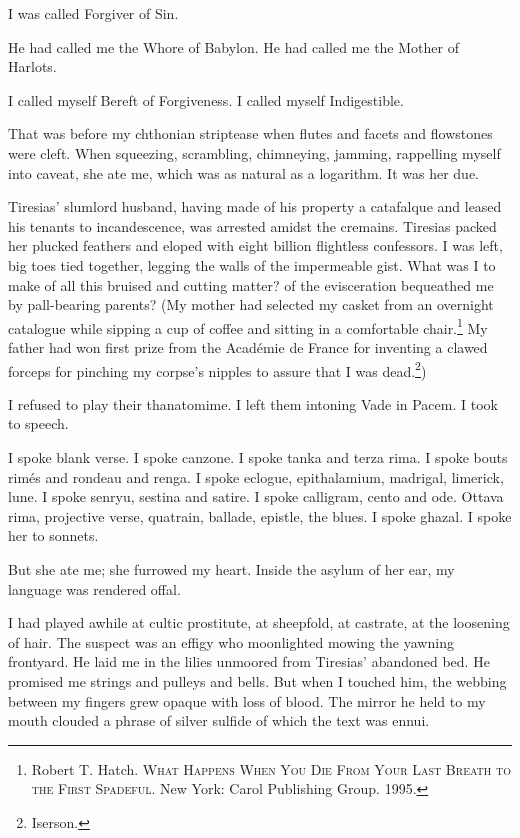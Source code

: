 \documentclass[
]{memoir}
\begin{document}
I was called Forgiver of Sin.

He had called me the Whore of Babylon. He had called me the Mother of
Harlots.

I called myself Bereft of Forgiveness. I called myself Indigestible.

That was before my chthonian striptease when flutes and facets and
flowstones were cleft. When squeezing, scrambling, chimneying, jamming,
rappelling myself into caveat, she ate me, which was as natural as a
logarithm. It was her due.

Tiresias' slumlord husband, having made of his property a catafalque and
leased his tenants to incandescence, was arrested amidst the cremains.
Tiresias packed her plucked feathers and eloped with eight billion
flightless confessors. I was left, big toes tied together, legging the
walls of the impermeable gist. What was I to make of all this bruised
and cutting matter? of the evisceration bequeathed me by pall-bearing
parents? (My mother had selected my casket from an overnight catalogue
while sipping a cup of coffee and sitting in a comfortable
chair.\footnote{Robert T. Hatch. \textsc{What Happens When You Die From
  Your Last Breath to the First Spadeful}. New York: Carol Publishing
  Group. 1995.} My father had won first prize from the Académie de
France for inventing a clawed forceps for pinching my corpse's nipples
to assure that I was dead.\footnote{Iserson.})

I refused to play their thanatomime. I left them intoning Vade in Pacem.
I took to speech.

I spoke blank verse. I spoke canzone. I spoke tanka and terza rima. I
spoke bouts rimés and rondeau and renga. I spoke eclogue, epithalamium,
madrigal, limerick, lune. I spoke senryu, sestina and satire. I spoke
calligram, cento and ode. Ottava rima, projective verse, quatrain,
ballade, epistle, the blues. I spoke ghazal. I spoke her to sonnets.

But she ate me; she furrowed my heart. Inside the asylum of her ear, my
language was rendered offal.

I had played awhile at cultic prostitute, at sheepfold, at castrate, at
the loosening of hair. The suspect was an effigy who moonlighted mowing
the yawning frontyard. He laid me in the lilies unmoored from Tiresias'
abandoned bed. He promised me strings and pulleys and bells. But when I
touched him, the webbing between my fingers grew opaque with loss of
blood. The mirror he held to my mouth clouded a phrase of silver sulfide
of which the text was ennui.
\end{document}
